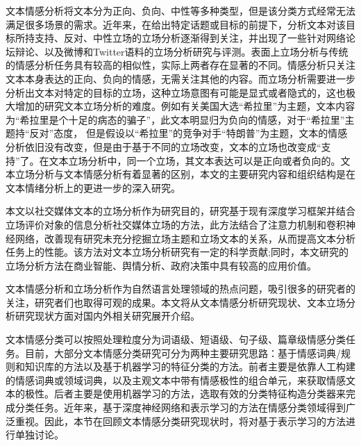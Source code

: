 文本情感分析将文本分为正向、负向、中性等多种类型，但是该分类方式经常无法满足很多场景的需求。近年来，在给出特定话题或目标的前提下，分析文本对该目标所持支持、反对、中性立场的立场分析逐渐得到关注，并出现了一些针对网络论坛辩论、以及微博和Twitter语料的立场分析研究与评测。表面上立场分析与传统的情感分析任务具有较高的相似性，实际上两者存在显著的不同。情感分析只关注文本本身表达的正向、负向的情感，无需关注其他的内容。而立场分析需要进一步分析出文本对特定的目标的立场，这种立场意图有可能是显式或者隐式的，这也极大增加的研究文本立场分析的难度。例如有关美国大选“希拉里”为主题，文本内容为“希拉里是个十足的病态的骗子”，此文本明显归为负向的情感，对于“希拉里”主题持“反对”态度， 但是假设以“希拉里”的竞争对手“特朗普”为主题，文本的情感分析依旧没有改变，但是由于基于不同的立场改变，文本的立场也改变成“支持”了。在文本立场分析中，同一个立场，其文本表达可以是正向或者负向的。文本立场分析与文本情感分析有着显著的区别，本文的主要研究内容和组织结构是在文本情绪分析上的更进一步的深入研究。

本文以社交媒体文本的立场分析作为研究目的，研究基于现有深度学习框架并结合立场评价对象的信息分析社交媒体立场的方法，此方法结合了注意力机制和卷积神经网络，改善现有研究未充分挖掘立场主题和立场文本的关系，从而提高文本分析任务上的性能。该方法对文本立场分析研究有一定的科学贡献;同时，本文研究的立场分析方法在商业智能、舆情分析、政府决策中具有较高的应用价值。



文本情感分析和立场分析作为自然语言处理领域的热点问题，吸引很多的研究者的关注，研究者们也取得可观的成果。本文将从文本情感分析研究现状、文本立场分析研究现状方面对国内外相关研究展开介绍。



文本情感分类可以按照处理粒度分为词语级、短语级、句子级、篇章级情感分类任务。目前，大部分文本情感分类研究可分为两种主要研究思路：基于情感词典/规则和知识库的方法以及基于机器学习的特征分类的方法。前者主要是依靠人工构建的情感词典或领域词典，以及主观文本中带有情感极性的组合单元，来获取情感文本的极性。后者主要是使用机器学习的方法，选取有效的分类特征构造分类器来完成分类任务。近年来，基于深度神经网络和表示学习的方法在情感分类领域得到广泛重视。因此，本节在回顾文本情感分类研究现状时，将对基于表示学习的方法进行单独讨论。


